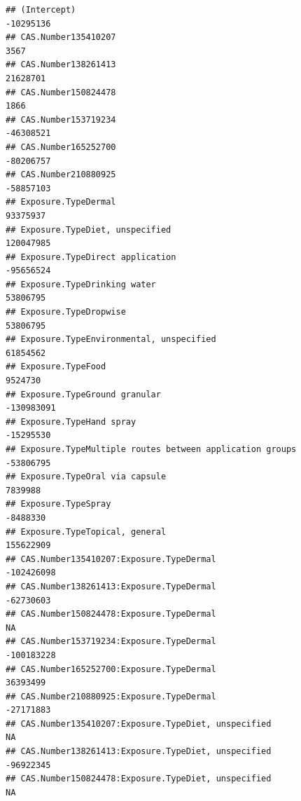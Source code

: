 \documentclass[
  12pt,
]{article}
\begin{document}
\begin{verbatim}
## (Intercept)                                                                  -10295136
## CAS.Number135410207                                                               3567
## CAS.Number138261413                                                           21628701
## CAS.Number150824478                                                               1866
## CAS.Number153719234                                                          -46308521
## CAS.Number165252700                                                          -80206757
## CAS.Number210880925                                                          -58857103
## Exposure.TypeDermal                                                           93375937
## Exposure.TypeDiet, unspecified                                               120047985
## Exposure.TypeDirect application                                              -95656524
## Exposure.TypeDrinking water                                                   53806795
## Exposure.TypeDropwise                                                         53806795
## Exposure.TypeEnvironmental, unspecified                                       61854562
## Exposure.TypeFood                                                              9524730
## Exposure.TypeGround granular                                                -130983091
## Exposure.TypeHand spray                                                      -15295530
## Exposure.TypeMultiple routes between application groups                      -53806795
## Exposure.TypeOral via capsule                                                  7839988
## Exposure.TypeSpray                                                            -8488330
## Exposure.TypeTopical, general                                                155622909
## CAS.Number135410207:Exposure.TypeDermal                                     -102426098
## CAS.Number138261413:Exposure.TypeDermal                                      -62730603
## CAS.Number150824478:Exposure.TypeDermal                                             NA
## CAS.Number153719234:Exposure.TypeDermal                                     -100183228
## CAS.Number165252700:Exposure.TypeDermal                                       36393499
## CAS.Number210880925:Exposure.TypeDermal                                      -27171883
## CAS.Number135410207:Exposure.TypeDiet, unspecified                                  NA
## CAS.Number138261413:Exposure.TypeDiet, unspecified                           -96922345
## CAS.Number150824478:Exposure.TypeDiet, unspecified                                  NA

\end{verbatim}
\end{document}
